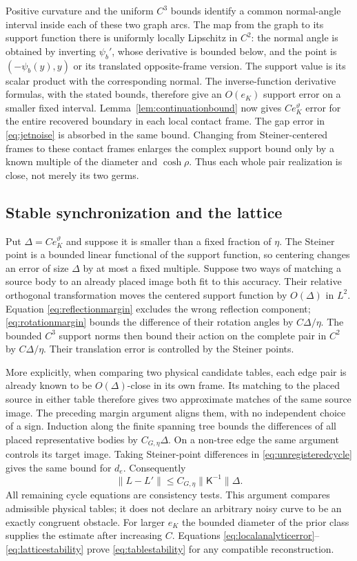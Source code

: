 Positive curvature and the uniform $C^3$ bounds identify a common
normal-angle interval inside each of these two graph arcs. The map
from the graph to its support function there is uniformly locally
Lipschitz in $C^2$: the normal angle is obtained by inverting
$\psi_b'$, whose derivative is bounded below, and the point is
$(-\psi_b(y),y)$ or its translated opposite-frame version.
The support value is its scalar product with the corresponding normal.
The inverse-function derivative formulas, with the stated bounds,
therefore give an $O(e_K)$ support error on a smaller fixed interval.
Lemma~\ref{lem:continuationbound} now gives $C e_K^{\vartheta}$
error for the entire recovered boundary in each local contact frame.
The gap error in \eqref{eq:jetnoise} is absorbed in the same bound.
Changing from Steiner-centered frames to these contact frames enlarges
the complex support bound only by a known multiple of the diameter and
$\cosh\rho$. Thus each whole pair realization is close, not merely
its two germs.

\subsection{Stable synchronization and the lattice}
Put $\Delta=C e_K^{\vartheta}$ and suppose it is smaller than a
fixed fraction of $\eta$. The Steiner point is a bounded linear
functional of the support function, so centering changes an error of
size $\Delta$ by at most a fixed multiple. Suppose two ways of
matching a source body to an already placed image both fit to this
accuracy. Their relative orthogonal transformation moves the centered
support function by $O(\Delta)$ in $L^2$. Equation
\eqref{eq:reflectionmargin} excludes the wrong reflection component;
\eqref{eq:rotationmargin} bounds the difference of their rotation
angles by $C\Delta/\eta$. The bounded $C^3$ support norms then
bound their action on the complete pair in $C^2$ by $C\Delta/\eta$.
Their translation error is controlled by the Steiner points.

More explicitly, when comparing two physical candidate tables, each
edge pair is already known to be $O(\Delta)$-close in its own frame.
Its matching to the placed source in either table therefore gives two
approximate matches of the same source image. The preceding margin
argument aligns them, with no independent choice of a sign. Induction
along the finite spanning tree bounds the differences of all placed
representative bodies by $C_{G,\eta}\Delta$. On a non-tree edge the
same argument controls its target image. Taking Steiner-point
differences in \eqref{eq:unregisteredcycle} gives the same bound for
$d_e$. Consequently
\begin{equation}\label{eq:latticestability}
 \|L-L'\|\le C_{G,\eta}\|\mathsf K^{-1}\|\Delta.
\end{equation}
All remaining cycle equations are consistency tests. This argument
compares admissible physical tables; it does not declare an arbitrary
noisy curve to be an exactly congruent obstacle. For larger $e_K$ the
bounded diameter of the prior class supplies the estimate after
increasing $C$. Equations \eqref{eq:localanalyticerror}--\eqref{eq:latticestability}
prove \eqref{eq:tablestability} for any compatible reconstruction.

